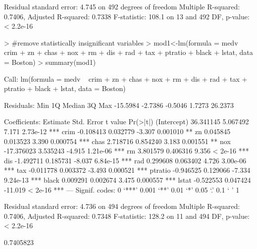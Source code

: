 \documentclass{article}
\begin{document}
\begin{enumerate}
\begin{Schunk}
\begin{Soutput}
Residual standard error: 4.745 on 492 degrees of freedom
Multiple R-squared:  0.7406,	Adjusted R-squared:  0.7338 
F-statistic: 108.1 on 13 and 492 DF,  p-value: < 2.2e-16
\end{Soutput}
\end{Schunk}

\begin{Schunk}
\begin{Sinput}
> #remove statistically insignificant variables
> mod1<-lm(formula = medv ~ crim + zn + chas + nox + rm + dis + rad + tax + ptratio + black + lstat, data = Boston)
> summary(mod1)
\end{Sinput}
\begin{Soutput}
Call:
lm(formula = medv ~ crim + zn + chas + nox + rm + dis + rad + 
    tax + ptratio + black + lstat, data = Boston)

Residuals:
     Min       1Q   Median       3Q      Max 
-15.5984  -2.7386  -0.5046   1.7273  26.2373 

Coefficients:
              Estimate Std. Error t value Pr(>|t|)    
(Intercept)  36.341145   5.067492   7.171 2.73e-12 ***
crim         -0.108413   0.032779  -3.307 0.001010 ** 
zn            0.045845   0.013523   3.390 0.000754 ***
chas          2.718716   0.854240   3.183 0.001551 ** 
nox         -17.376023   3.535243  -4.915 1.21e-06 ***
rm            3.801579   0.406316   9.356  < 2e-16 ***
dis          -1.492711   0.185731  -8.037 6.84e-15 ***
rad           0.299608   0.063402   4.726 3.00e-06 ***
tax          -0.011778   0.003372  -3.493 0.000521 ***
ptratio      -0.946525   0.129066  -7.334 9.24e-13 ***
black         0.009291   0.002674   3.475 0.000557 ***
lstat        -0.522553   0.047424 -11.019  < 2e-16 ***
---
Signif. codes:  0 ‘***’ 0.001 ‘**’ 0.01 ‘*’ 0.05 ‘.’ 0.1 ‘ ’ 1

Residual standard error: 4.736 on 494 degrees of freedom
Multiple R-squared:  0.7406,	Adjusted R-squared:  0.7348 
F-statistic: 128.2 on 11 and 494 DF,  p-value: < 2.2e-16
\end{Soutput}
\begin{Soutput}
[1] 0.7405823
\end{Soutput}
\end{Schunk}

\end{enumerate}

\end{document}
